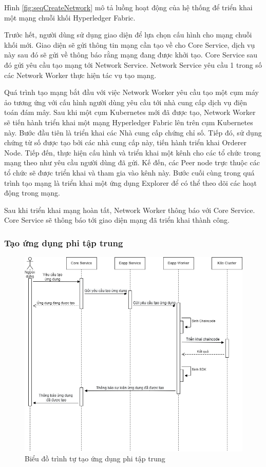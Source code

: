 \documentclass[../DoAn.tex]{subfiles}
\begin{document}
Hình \ref{fig:seqCreateNetwork} mô tả luồng hoạt động của hệ thống để triển
khai một mạng chuỗi khối Hyperledger Fabric.

Trước hết, người dùng sử dụng giao diện để lựa chọn cấu hình cho mạng chuỗi
khối mới. Giao diện sẽ gửi thông tin mạng cần tạo về cho Core Service, dịch vụ
này sau đó sẽ gửi về thông báo rằng mạng đang được khởi tạo. Core Service sau
đó gửi yêu cầu tạo mạng tới Network Service. Network Service yêu cầu 1 trong số
các Network Worker thực hiện tác vụ tạo mạng.

Quá trình tạo mạng bắt đầu với việc Network Worker yêu cầu tạo một cụm máy ảo
tương ứng với cấu hình người dùng yêu cầu tới nhà cung cấp dịch vụ điện toán
đám mây. Sau khi một cụm Kubernetes mới đã được tạo, Network Worker sẽ tiến
hành triển khai một mạng Hyperledger Fabric lên trên cụm Kubernetes này. Bước
đầu tiên là triển khai các Nhà cung cấp chứng chỉ số. Tiếp đó, sử dụng chứng từ
số được tạo bởi các nhà cung cấp này, tiến hành triển khai Orderer Node. Tiếp
đến, thực hiện cấu hình và triển khai một kênh cho các tổ chức trong mạng theo
như yêu cầu người dùng đã gửi. Kế đến, các Peer node trực thuộc các tổ chức sẽ
được triển khai và tham gia vào kênh này. Bước cuối cùng trong quá trình tạo
mạng là triển khai một ứng dụng Explorer để có thể theo dõi các hoạt động trong
mạng.

Sau khi triển khai mạng hoàn tất, Network Worker thông báo với Core Service.
Core Service sẽ thông báo tới giao diện mạng đã triển khai thành công.

\subsubsection{Tạo ứng dụng phi tập trung}

\begin{figure}[H]
    \centering
    \includegraphics[width=0.75\linewidth]{Hinhve/DoAn-SeqCreateDapp.drawio.png}
    \caption{Biểu đồ trình tự tạo ứng dụng phi tập trung}
    \label{fig:seqCreateDapp}
\end{figure}
\end{document}
